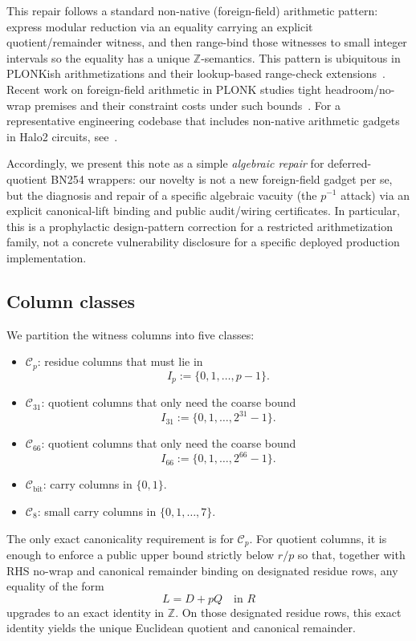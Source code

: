 ﻿\documentclass[11pt]{article}
\newcommand{\Z}{\mathbb{Z}}
\newcommand{\Cset}{\mathcal{C}}
\begin{document}
This repair follows a standard non-native (foreign-field) arithmetic pattern:
express modular reduction via an equality carrying an explicit
quotient/remainder witness, and then range-bind those witnesses to small
integer intervals so the equality has a unique \(\Z\)-semantics. This pattern
is ubiquitous in PLONKish arithmetizations and their lookup-based range-check
extensions~\cite{plonk2019,plookup2020,lookup-sok-2025}.
Recent work on foreign-field arithmetic in PLONK studies tight headroom/no-wrap
premises and their constraint costs under such bounds~\cite{foreignfield2025}.
For a representative engineering codebase that includes non-native arithmetic gadgets in
Halo2 circuits, see~\cite{halo2wrong}.

Accordingly, we present this note as a simple \emph{algebraic repair} for
deferred-quotient BN254 wrappers: our novelty is not a new foreign-field gadget
per se, but the diagnosis and repair of a specific algebraic vacuity (the
\(p^{-1}\) attack) via an explicit canonical-lift binding and public audit/wiring
certificates.
In particular, this is a prophylactic design-pattern correction for a restricted
arithmetization family, not a concrete vulnerability disclosure for a specific
deployed production implementation.

\subsection{Column classes}

We partition the witness columns into five classes:
\begin{itemize}[leftmargin=2em]
    \item \(\Cset_p\): residue columns that must lie in
    \[
    I_p := \{0,1,\dots,p-1\}.
    \]
    \item \(\Cset_{31}\): quotient columns that only need the coarse bound
    \[
    I_{31} := \{0,1,\dots,2^{31}-1\}.
    \]
    \item \(\Cset_{66}\): quotient columns that only need the coarse bound
    \[
    I_{66} := \{0,1,\dots,2^{66}-1\}.
    \]
    \item \(\Cset_{\mathrm{bit}}\): carry columns in \(\{0,1\}\).
    \item \(\Cset_{8}\): small carry columns in \(\{0,1,\dots,7\}\).
\end{itemize}

The only exact canonicality requirement is for \(\Cset_p\). For quotient
columns, it is enough to enforce a public upper bound strictly below \(r/p\) so
that, together with RHS no-wrap and canonical remainder binding on designated
residue rows, any equality of the form
\[
L = D + pQ
\quad\text{in }R
\]
upgrades to an exact identity in \(\Z\). On those designated residue rows, this
exact identity yields the unique Euclidean quotient and canonical remainder.
\end{document}
